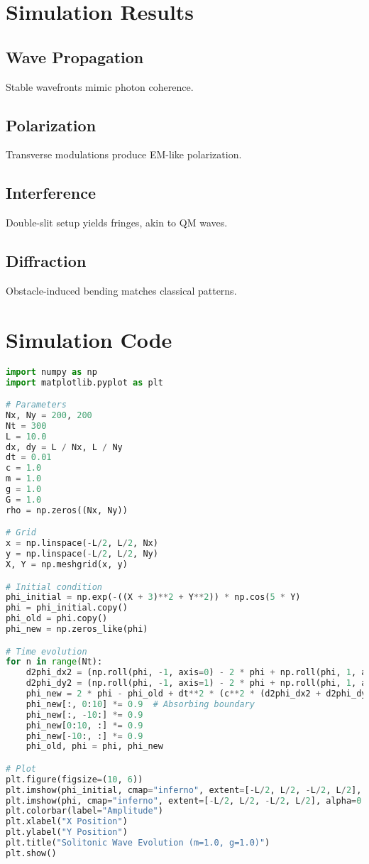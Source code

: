 \documentclass{article}
\begin{document}
\section{Simulation Results}
\subsection{Wave Propagation}
Stable wavefronts mimic photon coherence.
\subsection{Polarization}
Transverse modulations produce EM-like polarization.
\subsection{Interference}
Double-slit setup yields fringes, akin to QM waves.
\subsection{Diffraction}
Obstacle-induced bending matches classical patterns.

\section{Simulation Code}
\begin{lstlisting}[language=Python, caption=Solitonic Wave Propagation Simulation, label=lst:propagation]
import numpy as np
import matplotlib.pyplot as plt

# Parameters
Nx, Ny = 200, 200
Nt = 300
L = 10.0
dx, dy = L / Nx, L / Ny
dt = 0.01
c = 1.0
m = 1.0
g = 1.0
G = 1.0
rho = np.zeros((Nx, Ny))

# Grid
x = np.linspace(-L/2, L/2, Nx)
y = np.linspace(-L/2, L/2, Ny)
X, Y = np.meshgrid(x, y)

# Initial condition
phi_initial = np.exp(-((X + 3)**2 + Y**2)) * np.cos(5 * Y)
phi = phi_initial.copy()
phi_old = phi.copy()
phi_new = np.zeros_like(phi)

# Time evolution
for n in range(Nt):
    d2phi_dx2 = (np.roll(phi, -1, axis=0) - 2 * phi + np.roll(phi, 1, axis=0)) / dx**2
    d2phi_dy2 = (np.roll(phi, -1, axis=1) - 2 * phi + np.roll(phi, 1, axis=1)) / dy**2
    phi_new = 2 * phi - phi_old + dt**2 * (c**2 * (d2phi_dx2 + d2phi_dy2) - m**2 * phi - g * phi**3 + 8 * np.pi * G * rho)
    phi_new[:, 0:10] *= 0.9  # Absorbing boundary
    phi_new[:, -10:] *= 0.9
    phi_new[0:10, :] *= 0.9
    phi_new[-10:, :] *= 0.9
    phi_old, phi = phi, phi_new

# Plot
plt.figure(figsize=(10, 6))
plt.imshow(phi_initial, cmap="inferno", extent=[-L/2, L/2, -L/2, L/2], label="Initial State")
plt.imshow(phi, cmap="inferno", extent=[-L/2, L/2, -L/2, L/2], alpha=0.5)
plt.colorbar(label="Amplitude")
plt.xlabel("X Position")
plt.ylabel("Y Position")
plt.title("Solitonic Wave Evolution (m=1.0, g=1.0)")
plt.show()
\end{lstlisting}
\end{document}
